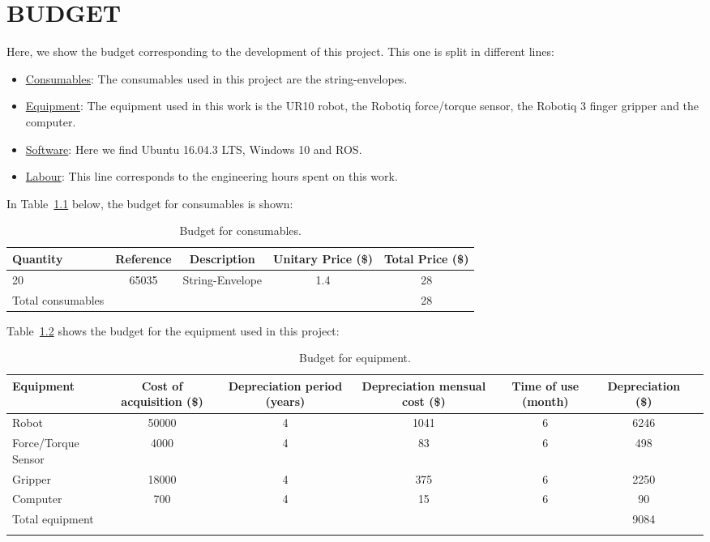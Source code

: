 \chapter{BUDGET}
\label{ch:budget}
Here, we show the budget corresponding to the development of this project. This one is split in different lines:
\begin{itemize}
	\item \underline{Consumables}: The consumables used in this project are the string-envelopes.
	\item \underline{Equipment}: The equipment used in this work is the UR10 robot, the Robotiq force/torque sensor, the Robotiq 3 finger gripper and the computer.
	\item \underline{Software}: Here we find Ubuntu 16.04.3 LTS, Windows 10 and ROS.
	\item \underline{Labour}: This line corresponds to the engineering hours spent on this work.
\end{itemize}

In Table~\ref{tab:consumables} below, the budget for consumables is shown:
\begin{table}[h!]
	\centering
	\begin{tabular}{p{8em}cccc}
		\toprule
		{Quantity} & \multicolumn{1}{c}{{Reference}} & \multicolumn{1}{c}{{Description}} &  \multicolumn{1}{p{8em}}{Unitary Price (\$)} & \multicolumn{1}{p{8em}}{Total Price (\$)} \\
		\midrule
		\multicolumn{1}{p{4em}}{20} & 65035 & \multicolumn{1}{p{8em}}{String-Envelope} & 1.4   & 28 \\
		\midrule
		\multicolumn{1}{p{12em}}{Total consumables} &       &       &       & 28 \\
		\bottomrule
	\end{tabular}%
	\caption{Budget for consumables.}
	\label{tab:consumables}%
\end{table}%

Table~\ref{tab:equipment} shows the budget for the equipment used in this project:
\setlength\LTpost{0pt}
\begin{longtable} {p{6em}cccccc}
		\toprule
		Equipment & \multicolumn{1}{p{6.5em}}{Cost of acquisition (\$)} & \multicolumn{1}{p{7em}}{Depreciation period (years)} & \multicolumn{1}{p{9em}}{Depreciation mensual cost (\$)} & \multicolumn{1}{p{6em}}{Time of use (month)} & \multicolumn{1}{p{3em}}{Depreciation (\$)} \\
		\midrule
		Robot & 50000 & 4     & 1041  & 6     & 6246 \\
		\midrule
		Force/Torque Sensor & 4000  & 4     & 83    & 6     & 498 \\
		\midrule
		Gripper & 18000 & 4     & 375   & 6     & 2250 \\
		\midrule
		Computer & 700   & 4     & 15    & 6     & 90 \\
		\midrule
		Total equipment &       &       &       &       & 9084 \\
		\bottomrule
	\caption{Budget for equipment.}
	\label{tab:equipment}%
\end{longtable}%

